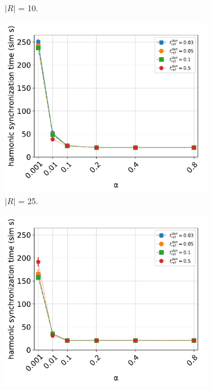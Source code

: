 \begin{figure}[ht!]
\begin{subfigure}[b]{0.5\textwidth}
		\caption{$|R|$ = 10.}
		\label{fig:sub:t_ref_dyn_x_alpha_collsize10}
	  \end{subfigure}
	  \begin{subfigure}[b]{0.5\textwidth}
		\centering\captionsetup{width=.9\linewidth}%
		\includegraphics[width=\textwidth]{Assets/DocSegments/Chapters/ExperimentsAndResults/Figures/PerfScores/t_ref_dyn_x_alpha_hyperparamtuning_experiment_plot_collsize25.pdf}
		\caption{$|R|$ = 25.}
		\label{fig:sub:t_ref_dyn_x_alpha_collsize25}
	  \end{subfigure}
	  \begin{subfigure}[b]{0.5\textwidth}
		\centering\captionsetup{width=.9\linewidth}%
		\includegraphics[width=\textwidth]{Assets/DocSegments/Chapters/ExperimentsAndResults/Figures/PerfScores/t_ref_dyn_x_alpha_hyperparamtuning_experiment_plot_collsize50.pdf}

\end{subfigure}
\end{figure}
